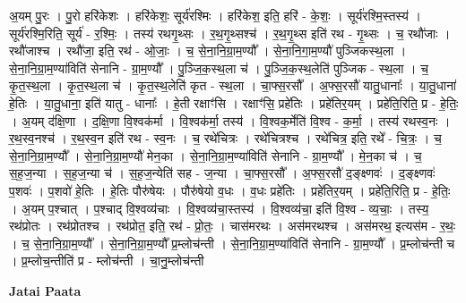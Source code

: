 \documentclass[17pt]{extarticle}
\begin{document}
अ॒यम् पु॒रः । पु॒रो हरि॑केशः । हरि॑केशः॒ सूर्य॑रश्मिः । हरि॑केश॒ इति॒ हरि॑ - के॒शः॒ । सूर्य॑रश्मि॒स्तस्य॑ । सूर्य॑रश्मि॒रिति॒ सूर्य॑ - र॒श्मिः॒ । तस्य॑ रथगृ॒थ्सः । र॒थ॒गृ॒थ्सश्च॑ । र॒थ॒गृ॒थ्स इति॑ रथ - गृ॒थ्सः । च॒ रथौ॑जाः । रथौ॑जाश्च । रथौ॑जा॒ इति॒ रथ॑ - ओ॒जाः॒ । च॒ से॒ना॒नि॒ग्रा॒म॒ण्यौ᳚ । से॒ना॒नि॒गा॒म॒ण्यौ॑ पुञ्जिकस्थ॒ला । से॒ना॒नि॒ग्रा॒म॒ण्या॑विति॑ सेनानि - ग्रा॒म॒ण्यौ᳚ । पु॒ञ्जि॒क॒स्थ॒ला च॑ । पु॒ञ्जि॒क॒स्थ॒लेति॑ पुञ्जिक - स्थ॒ला । च॒ कृ॒त॒स्थ॒ला । कृ॒त॒स्थ॒ला च॑ । कृ॒त॒स्थ॒लेति॑ कृत - स्थ॒ला । चा॒फ्स॒रसौ᳚ । अ॒फ्स॒रसौ॑ यातु॒धानाः᳚ । या॒तु॒धाना॑ हे॒तिः । या॒तु॒धाना॒ इति॑ यातु - धानाः᳚ । हे॒ती रक्षाꣳ॑सि । रक्षाꣳ॑सि॒ प्रहे॑तिः । प्रहे॑तिर॒यम् । प्रहे॑ति॒रिति॒ प्र - हे॒तिः॒ । अ॒यम् द॑क्षि॒णा । द॒क्षि॒णा वि॒श्वक॑र्मा । वि॒श्वक॑र्मा॒ तस्य॑ । वि॒श्वक॒र्मेति॑ वि॒श्व - क॒र्मा॒ । तस्य॑ रथस्व॒नः । र॒थ॒स्व॒नश्च॑ । र॒थ॒स्व॒न इति॑ रथ - स्व॒नः । च॒ रथे॑चित्रः । रथे॑चित्रश्च । रथे॑चित्र॒ इति॒ रथे᳚ - चि॒त्रः॒ । च॒ से॒ना॒नि॒ग्रा॒म॒ण्यौ᳚ । से॒ना॒नि॒ग्रा॒म॒ण्यौ॑ मेन॒का । से॒ना॒नि॒ग्रा॒म॒ण्या॑विति॑ सेनानि - ग्रा॒म॒ण्यौ᳚ । मे॒न॒का च॑ । च॒ स॒ह॒ज॒न्या । स॒ह॒ज॒न्या च॑ । स॒ह॒ज॒न्येति॑ सह - ज॒न्या । चा॒फ्स॒रसौ᳚ । अ॒फ्स॒रसौ॑ द॒ङ्क्ष्णवः॑ । द॒ङ्क्ष्णवः॑ प॒शवः॑ । प॒शवो॑ हे॒तिः । हे॒तिः पौरु॑षेयः । पौरु॑षेयो व॒धः । व॒धः प्रहे॑तिः । प्रहे॑तिर॒यम् । प्रहे॑ति॒रिति॒ प्र - हे॒तिः॒ । अ॒यम् प॒श्चात् । प॒श्चाद् वि॒श्वव्य॑चाः । वि॒श्वव्य॑चा॒स्तस्य॑ । वि॒श्वव्य॑चा॒ इति॑ वि॒श्व - व्य॒चाः॒ । तस्य॒ रथ॑प्रोतः । रथ॑प्रोतश्च । रथ॑प्रोत॒ इति॒ रथ॑ - प्रो॒तः॒ । चास॑मरथः । अस॑मरथश्च । अस॑मरथ॒ इत्यस॑म - र॒थः॒ । च॒ से॒ना॒नि॒ग्रा॒म॒ण्यौ᳚ । से॒ना॒नि॒ग्रा॒म॒ण्यौ᳚ प्र॒म्लोच॑न्ती । से॒ना॒नि॒ग्रा॒म॒ण्या॑विति॑ सेनानि - ग्रा॒म॒ण्यौ᳚ । प्र॒म्लोच॑न्ती च । प्र॒म्लोच॒न्तीति॑ प्र - म्लोच॑न्ती । चा॒नु॒म्लोच॑न्ती \newline

\textbf{Jatai Paata} \newline
\end{document}

